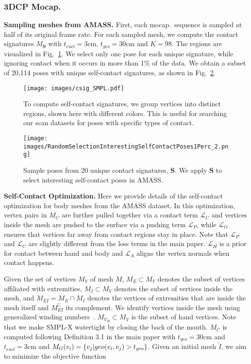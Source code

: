 \documentclass[final]{cvpr}
\newcommand{\geoth}{t_{\mathit{geo}}}
\newcommand{\euclth}{t_{\mathit{eucl}}}
\newcommand{\nummeshes}{20,114}
\theoremstyle{definition}
\begin{document}
\subsubsection{3DCP Mocap.} 
\textbf{Sampling meshes from AMASS.} 
First, each mocap.~sequence is sampled at half of its original frame rate. 
For each sampled mesh, we compute the contact signatures $M_\mathbf {S}$ with $\euclth = 3$cm, $\geoth = 30$cm and $K=98$.
The regions are visualized in Fig.~\ref{fig:csigSMPLSMPLX}.
We select only one pose for each unique signature, while ignoring contact when it occurs in more than 1\% of the data. We obtain a subset of {\nummeshes} poses with unique self-contact signatures, as shown in Fig.~\ref{fig:RandomSelectionInterestingSelfContactPoses1Perc}. 

\begin{figure}[t]
	\centerline{	\texttt{[image: images/csig\_SMPL.pdf]}
	}
	\caption{To compute self-contact signatures, we group vertices into distinct regions, shown here with different colors.
		This is useful for searching our scan datasets for poses with specific types of contact.}
	\label{fig:csigSMPLSMPLX}
\end{figure}

\begin{figure}[t!]
\centerline{
\texttt{[image: images/RandomSelectionInterestingSelfContactPoses1Perc\_2.png]}}
\vspace{-0.06in}
	\caption{Sample poses from 20 unique contact signatures, $\mathbf{S}$. We apply $\mathbf {S}$ to select interesting self-contact poses in AMASS.}
	\label{fig:RandomSelectionInterestingSelfContactPoses1Perc}
\end{figure}

\textbf{Self-Contact Optimization.} Here we provide details of the self-contact optimization for body meshes from the AMASS dataset. In this optimization, vertex pairs in $M_C$ are further pulled together via a contact term $\mathcal{L}_{C}$ and vertices inside the mesh are pushed to the surface via a pushing term $\mathcal{L}_{P}$, while $\mathcal{L}_{O}$ ensures that vertices far away from contact regions stay in place. Note that $\mathcal{L}_{P}$ and $\mathcal{L}_{C}$ are slightly different from the loss terms in the main paper. $\mathcal{L}_{H}$ is a prior for contact between hand and body and $\mathcal{L}_{A}$ aligns the vertex normals when contact happens.

Given the set of vertices $M_V$ of mesh $M$, $M_{E} \subset M_V$ denotes the subset of vertices affiliated with extremities, $M_{I} \subset M_V$ denotes the subset of vertices inside the mesh, and $M_{EI} = M_{E} \cap M_{I}$ denotes the vertices of extremities that are inside the mesh itself and $M_{EI}^\complement$ its complement. 
We identify vertices inside the mesh using generalized winding numbers~\cite{jacobson2013robust}. $M_{V_H} \subset M_V$ is the subset of hand vertices. Note that we make SMPL-X watertight by closing the back of the mouth. $M_{C}$ is computed following Definition 3.1 
in the main paper with $\geoth = 30$cm and $\euclth = 3$cm and $\mathnormal{M}_{G}(v_i) = \{v_j | geo(v_i,v_j) > \geoth \}$. Given an initial mesh $\tilde{I}$, we aim to minimize the objective function
\end{document}
